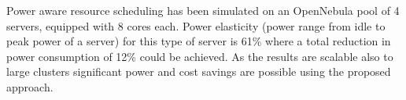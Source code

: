 Power aware resource scheduling has been simulated on an OpenNebula \cite{fontan2008opennebula} pool of 4 servers, equipped with 8 cores each. Power elasticity (power range from idle to peak power of a server) for this type of server is 61\% where a total reduction in power consumption of 12\% could be achieved. As the results are scalable also to large clusters significant power and cost savings are possible using the proposed approach. 


%
%
%
%
%
%
